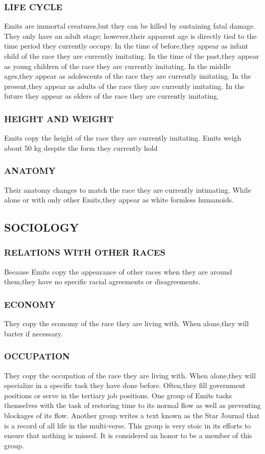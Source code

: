 \subsubsection{LIFE CYCLE}
Emits are immortal creatures,but they can be killed by sustaining fatal damage.
They only have an adult stage; however,their apparent age is directly tied to
the time period they currently occupy.  In the time of before,they appear as
infant child of the race they are currently imitating.  In the time of the
past,they appear as young children of the race they are currently imitating.
In the middle ages,they appear as adolescents of the race they are currently
imitating.  In the present,they appear as adults of the race they are currently
imitating.  In the future they appear as elders of the race they are currently
imitating.  
\subsubsection{HEIGHT AND WEIGHT}
Emits copy the height of the race they are currently imitating.  Emits weigh
about 50 kg despite the form they currently hold
\subsubsection{ANATOMY}
Their anatomy changes to match the race they are currently intimating.  While
alone or with only other Emits,they appear as white formless humanoids.
\subsection{SOCIOLOGY}
\subsubsection{RELATIONS WITH OTHER RACES}
Because Emits copy the appearance of other races when they are around them,they
have no specific racial agreements or disagreements.
\subsubsection{ECONOMY}
They copy the economy of the race they are living with.  When alone,they will
barter if necessary.
\subsubsection{OCCUPATION}
They copy the occupation of the race they are living with.  When alone,they
will specialize in a specific task they have done before.  Often,they fill
government positions or serve in the tertiary job positions.  One group of
Emits tasks themselves with the task of restoring time to its normal flow as
well as preventing blockages of its flow.  Another group writes a text known as
the Star Journal that is a record of all life in the multi-verse.  This group
is very stoic in its efforts to ensure that nothing is missed.  It is
considered an honor to be a member of this group.
